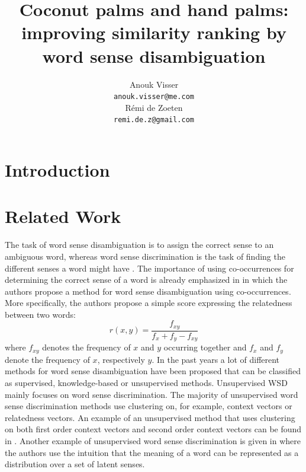 \documentclass[11pt]{article}
\title{Coconut palms and hand palms: improving similarity ranking by word sense disambiguation}
\author{Anouk Visser \\
  {\tt anouk.visser@me.com} \\\And
  R\'emi de Zoeten \\
  {\tt remi.de.z@gmail.com} \\}
\date{}
\begin{document}
\maketitle
\begin{abstract}


\end{abstract}

\section{Introduction}

\section{Related Work}
The task of word sense disambiguation is to assign the correct sense to an ambiguous word, whereas word sense discrimination is the task of finding the different senses a word might have \cite{old}. The importance of using co-occurrences for determining the correct sense of a word is already emphasized in \cite{relatedness} in which the authors propose a method for word sense disambiguation using co-occurrences. More specifically, the authors propose a simple score expressing the relatedness between two words:
\begin{equation}\label{r}r(x, y) = \frac{f_{xy}}{f_x+f_y - f_{xy}}\end{equation}
where $f_{xy}$ denotes the frequency of $x$ and $y$ occurring together and $f_x$ and $f_y$ denote the frequency of $x$, respectively $y$. 
In the past years a lot of different methods for word sense disambiguation have been proposed that can be classified as supervised, knowledge-based or unsupervised methods\cite{survey}. Unsupervised WSD mainly focuses on word sense discrimination. The majority of unsupervised word sense discrimination methods use clustering on, for example, context vectors or relatedness vectors. An example of an unsupervised method that uses clustering on both first order context vectors and second order context vectors can be found in \cite{clustering}. Another example of unsupervised word sense discrimination is given in \cite{latent} where the authors use the intuition that the meaning of a word can be represented as a distribution over a set of latent senses.
\end{document}
